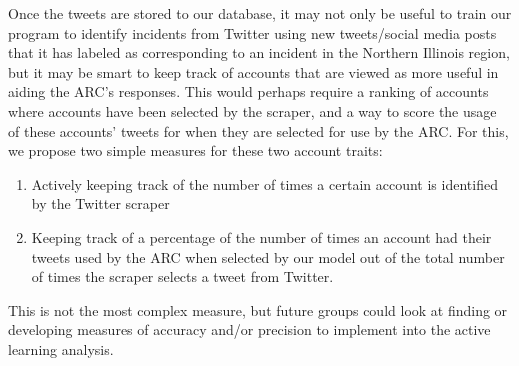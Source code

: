 \documentclass[titlepage, 12pt]{article}
\begin{document}
\hspace{0.5 cm}Once the tweets are stored to our database, it may not only be useful to train our program to identify incidents from Twitter using new tweets/social media posts that it has labeled as corresponding to an incident in the Northern Illinois region, but it may be smart to keep track of accounts that are viewed as more useful in aiding the ARC's responses. This would perhaps require a ranking of accounts where accounts have been selected by the scraper, and a way to score the usage of these accounts' tweets for when they are selected for use by the ARC. For this, we propose two simple measures for these two account traits:
\begin{enumerate}
    \item Actively keeping track of the number of times a certain account is identified by the Twitter scraper
    \item Keeping track of a percentage of the number of times an account had their tweets used by the ARC when selected by our model out of the total number of times the scraper selects a tweet from Twitter.
\end{enumerate}

This is not the most complex measure, but future groups could look at finding or developing measures of accuracy and/or precision to implement into the active learning analysis.


\end{document}
